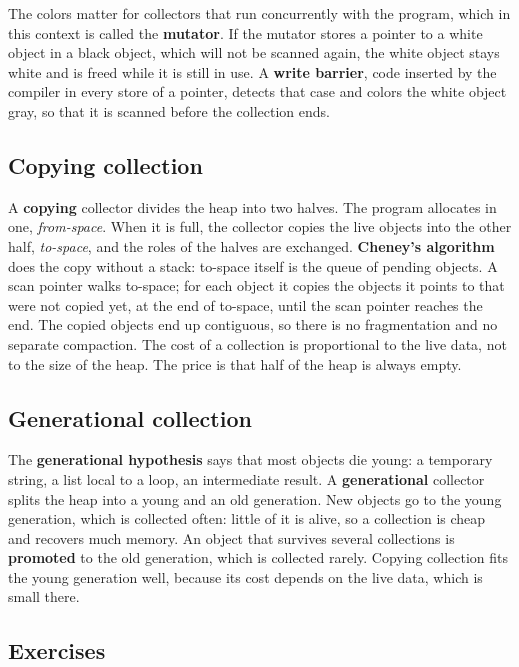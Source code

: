 The colors matter for collectors that run concurrently with the program,
which in this context is called the \textbf{mutator}. If the mutator stores a
pointer to a white object in a black object, which will not be scanned again,
the white object stays white and is freed while it is still in use. A
\textbf{write barrier}, code inserted by the compiler in every store of a
pointer, detects that case and colors the white object gray, so that it is
scanned before the collection ends.

\subsection{Copying collection}

A \textbf{copying} collector divides the heap into two halves. The program
allocates in one, \emph{from-space}. When it is full, the collector copies the
live objects into the other half, \emph{to-space}, and the roles of the
halves are exchanged. \textbf{Cheney's algorithm} does the copy without a stack:
to-space itself is the queue of pending objects. A scan pointer walks
to-space; for each object it copies the objects it points to that were not
copied yet, at the end of to-space, until the scan pointer reaches the end.
The copied objects end up contiguous, so there is no fragmentation and no
separate compaction. The cost of a collection is proportional to the live
data, not to the size of the heap. The price is that half of the heap is
always empty.

\subsection{Generational collection}

The \textbf{generational hypothesis} says that most objects die young: a
temporary string, a list local to a loop, an intermediate result. A
\textbf{generational} collector splits the heap into a young and an old
generation. New objects go to the young generation, which is collected often:
little of it is alive, so a collection is cheap and recovers much memory. An
object that survives several collections is \textbf{promoted} to the old
generation, which is collected rarely. Copying collection fits the young
generation well, because its cost depends on the live data, which is small
there.

\subsection{Exercises}


